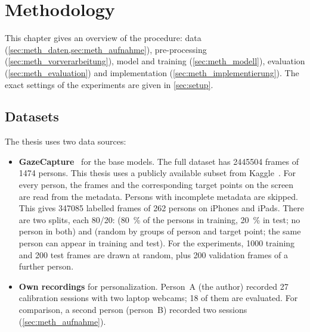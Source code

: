 \chapter{Methodology}
\label{ch:methodik}

This chapter gives an overview of the procedure: data
(\cref{sec:meth_daten,sec:meth_aufnahme}), pre-processing
(\cref{sec:meth_vorverarbeitung}), model and training (\cref{sec:meth_modell}),
evaluation (\cref{sec:meth_evaluation}) and implementation
(\cref{sec:meth_implementierung}). The exact settings of the experiments are
given in \cref{sec:setup}.

\section{Datasets}
\label{sec:meth_daten}
The thesis uses two data sources:
\begin{itemize}
  \item \textbf{GazeCapture}~\cite{krafka2016itracker} for the base models. The
        full dataset has \num{2445504} frames of \num{1474} persons. This
        thesis uses a publicly available subset from
        Kaggle~\cite{kaggle_gazecapture}. For every person, the frames and the
        corresponding target points on the screen are read from the metadata.
        Persons with incomplete metadata are skipped. This gives \num{347085}
        labelled frames of 262 persons on iPhones and iPads. There are two splits, each 80/20:
         (\SI{80}{\percent} of the persons in training,
        \SI{20}{\percent} in test; no person in both) and  (random by
        groups of person and target point; the same person can appear in
        training and test). For the experiments, \num{1000} training and
        \num{200} test frames are drawn at random, plus 200 validation frames
        of a further person.
  \item \textbf{Own recordings} for personalization. Person~A (the author)
        recorded 27 calibration sessions with two laptop webcams; 18 of them are
        evaluated. For comparison, a second person (person~B) recorded two
        sessions (\cref{sec:meth_aufnahme}).
\end{itemize}

